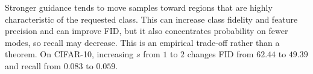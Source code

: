 \documentclass{article}
\begin{document}
Stronger guidance tends to move samples toward regions that are highly characteristic of the requested class. This can increase class fidelity and feature precision and can improve FID, but it also concentrates probability on fewer modes, so recall may decrease. This is an empirical trade-off rather than a theorem. On CIFAR-10, increasing $s$ from $1$ to $2$ changes FID from $62.44$ to $49.39$ and recall from $0.083$ to $0.059$.
\end{document}
